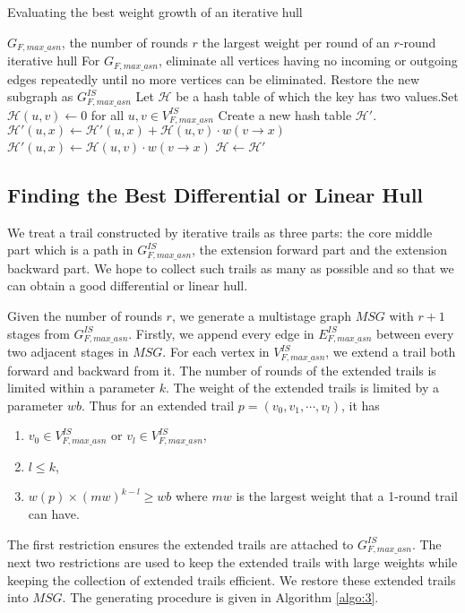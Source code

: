\begin{algorithm}
	\caption{Evaluating the best weight growth of an iterative hull}
	\label{algo:2}
	\begin{algorithmic}[1]
		\Require $G_{F,max\_asn}$, the number of rounds $r$
		\Ensure the largest weight per round of an $r$-round iterative hull
		\Procedure {}{}
		\State For $G_{F,max\_asn}$, eliminate all vertices having no incoming or outgoing edges repeatedly until no more vertices can be eliminated. Restore the new subgraph as $G^{IS}_{F,max\_asn}$
		\State Let $\mathcal{H}$ be a hash table of which the key has two values.Set $\mathcal{H}(u,v)\leftarrow 0$ for all $u,v\in V^{IS}_{F,max\_asn}$
		\State Create a new hash table $\mathcal{H}'$. 
		\State $\mathcal{H}'(u,x)\leftarrow \mathcal{H}'(u,x)+\mathcal{H}(u,v)\cdot w(v\rightarrow x)$
		\Else 
		\State $\mathcal{H}'(u,x)\leftarrow \mathcal{H}(u,v)\cdot w(v\rightarrow x)$
		\EndIf
		\EndFor
		\EndFor
		\State $\mathcal{H}\leftarrow \mathcal{H}'$
		\EndFor
		\State {}
		\EndProcedure
	\end{algorithmic}
\end{algorithm}

\subsection{Finding the Best Differential or Linear Hull}\label{sec:fbh}

We treat a trail constructed by iterative trails as three parts: the core middle part which is a path in $G^{IS}_{F,max\_asn}$, the extension forward part and the extension backward part. We hope to collect such trails as many as possible and so that we can obtain a good differential or linear hull. 

Given the number of rounds $r$, we generate a multistage graph $MSG$ with $r+1$ stages from $G^{IS}_{F,max\_asn}$. Firstly, we append every edge in $E^{IS}_{F,max\_asn}$ between every two adjacent stages in $MSG$. For each vertex in $V^{IS}_{F,max\_asn}$, we extend a trail both forward and backward from it. The number of rounds of the extended trails is limited within a parameter $k$. The weight of the extended trails is limited by a parameter $wb$. Thus for an extended trail $p=(v_0,v_1,\cdots,v_l)$, it has 
\begin{enumerate}
	\item $v_0\in V^{IS}_{F,max\_asn}$ or $v_l\in V^{IS}_{F,max\_asn}$,
	\item $l\leq k$,
	\item $w(p)\times (mw)^{k-l} \geq wb$ where $mw$ is the largest weight that a 1-round trail can have.
\end{enumerate}
The first restriction ensures the extended trails are attached to $G^{IS}_{F,max\_asn}$. The next two restrictions are used to keep the extended trails with large weights while keeping the collection of extended trails efficient. We restore these extended trails into $MSG$. The generating procedure is given in Algorithm \ref{algo:3}. 

